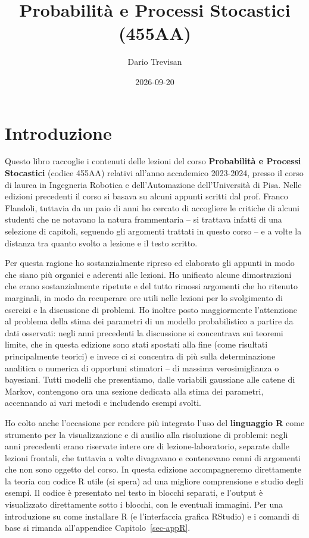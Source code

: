 \documentclass[
  italian,
  letterpaper,
]{book}
\title{Probabilità e Processi Stocastici (455AA)}
\subtitle{Appunti del corso\\
\strut \\
A.A. 2026-2027}
\author{Dario Trevisan}
\date{2026-09-20}
\renewcommand*\contentsname{Indice}
\newcommand\contentsname{Indice}
\theoremstyle{definition}
\theoremstyle{remark}
\begin{document}
\frontmatter
\maketitle

\renewcommand*\contentsname{Indice}
{
\setcounter{tocdepth}{2}
\tableofcontents
}

\mainmatter
{}

\chapter{Introduzione}\label{introduzione}

Questo libro raccoglie i contenuti delle lezioni del corso
\textbf{Probabilità e Processi Stocastici} (codice 455AA) relativi
all'anno accademico 2023-2024, presso il corso di laurea in Ingegneria
Robotica e dell'Automazione dell'Università di Pisa. Nelle edizioni
precedenti il corso si basava su alcuni appunti scritti dal prof. Franco
Flandoli, tuttavia da un paio di anni ho cercato di accogliere le
critiche di alcuni studenti che ne notavano la natura frammentaria -- si
trattava infatti di una selezione di capitoli, seguendo gli argomenti
trattati in questo corso -- e a volte la distanza tra quanto svolto a
lezione e il testo scritto.

Per questa ragione ho sostanzialmente ripreso ed elaborato gli appunti
in modo che siano più organici e aderenti alle lezioni. Ho unificato
alcune dimostrazioni che erano sostanzialmente ripetute e del tutto
rimossi argomenti che ho ritenuto marginali, in modo da recuperare ore
utili nelle lezioni per lo svolgimento di esercizi e la discussione di
problemi. Ho inoltre posto maggiormente l'attenzione al problema della
stima dei parametri di un modello probabilistico a partire da dati
osservati: negli anni precedenti la discussione si concentrava sui
teoremi limite, che in questa edizione sono stati spostati alla fine
(come risultati principalmente teorici) e invece ci si concentra di più
sulla determinazione analitica o numerica di opportuni stimatori -- di
massima verosimiglianza o bayesiani. Tutti modelli che presentiamo,
dalle variabili gaussiane alle catene di Markov, contengono ora una
sezione dedicata alla stima dei parametri, accennando ai vari metodi e
includendo esempi svolti.

Ho colto anche l'occasione per rendere più integrato l'uso del
\textbf{linguaggio R} come strumento per la visualizzazione e di ausilio
alla risoluzione di problemi: negli anni precedenti erano riservate
intere ore di lezione-laboratorio, separate dalle lezioni frontali, che
tuttavia a volte divagavano e contenevano cenni di argomenti che non
sono oggetto del corso. In questa edizione accompagneremo direttamente
la teoria con codice R utile (si spera) ad una migliore comprensione e
studio degli esempi. Il codice è presentato nel testo in blocchi
separati, e l'output è visualizzato direttamente sotto i blocchi, con le
eventuali immagini. Per una introduzione su come installare R (e
l'interfaccia grafica RStudio) e i comandi di base si rimanda
all'appendice Capitolo~\ref{sec-appR}.
\end{document}
